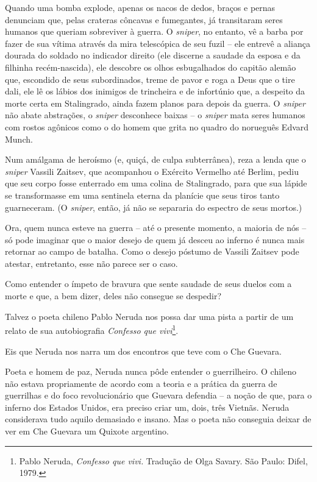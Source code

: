 Quando uma bomba explode, apenas os nacos de dedos, braços e pernas
denunciam que, pelas crateras côncavas e fumegantes, já transitaram
seres humanos que queriam sobreviver à guerra. O \emph{sniper}, no
entanto, vê a barba por fazer de sua vítima através da mira telescópica
de seu fuzil -- ele entrevê a aliança dourada do soldado no indicador
direito (ele discerne a saudade da esposa e da filhinha recém-nascida),
ele descobre os olhos esbugalhados do capitão alemão que, escondido de
seus subordinados, treme de pavor e roga a Deus que o tire dali, ele lê
os lábios dos inimigos de trincheira e de infortúnio que, a despeito da
morte certa em Stalingrado, ainda fazem planos para depois da guerra. O
\emph{sniper} não abate abstrações, o \emph{sniper} desconhece baixas --
o \emph{sniper} mata seres humanos com rostos agônicos como o do homem
que grita no quadro do norueguês Edvard Munch.

Num amálgama de heroísmo (e, quiçá, de culpa subterrânea), reza a lenda
que o \emph{sniper} Vassili Zaitsev, que acompanhou o Exército Vermelho
até Berlim, pediu que seu corpo fosse enterrado em uma colina de
Stalingrado, para que sua lápide se transformasse em uma sentinela
eterna da planície que seus tiros tanto guarneceram. (O \emph{sniper},
então, já não se separaria do espectro de seus mortos.)

Ora, quem nunca esteve na guerra -- até o presente momento, a maioria de
nós -- só pode imaginar que o maior desejo de quem já desceu ao inferno
é nunca mais retornar ao campo de batalha. Como o desejo póstumo de
Vassili Zaitsev pode atestar, entretanto, esse não parece ser o caso.

Como entender o ímpeto de bravura que sente saudade de seus duelos com a
morte e que, a bem dizer, deles não consegue se despedir?

Talvez o poeta chileno Pablo Neruda nos possa dar uma pista a partir de
um relato de sua autobiografia \emph{Confesso que vivi}\footnote{Pablo
  Neruda, \emph{Confesso que vivi.} Tradução de Olga Savary. São Paulo:
  Difel, 1979.}.

Eis que Neruda nos narra um dos encontros que teve com o Che Guevara.

Poeta e homem de paz, Neruda nunca pôde entender o guerrilheiro. O
chileno não estava propriamente de acordo com a teoria e a prática da
guerra de guerrilhas e do foco revolucionário que Guevara defendia -- a
noção de que, para o inferno dos Estados Unidos, era preciso criar um,
dois, três Vietnãs. Neruda considerava tudo aquilo demasiado e insano.
Mas o poeta não conseguia deixar de ver em Che Guevara um Quixote
argentino.

